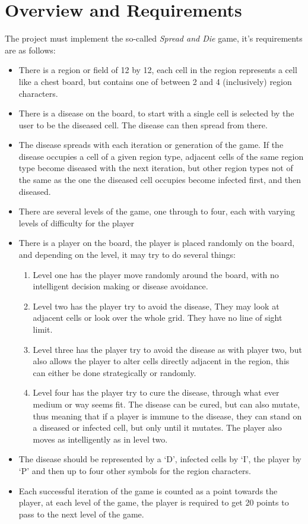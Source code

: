 \documentclass[pdftex,12pt,a4paper]{article}
\begin{document}
	\section{Overview and Requirements}
		The project must implement the so-called \emph{Spread and Die} game, it's requirements are as follows:
		\begin{itemize}
			\item There is a region or field of 12 by 12, each cell in the region represents a cell like a chest board, but contains one of between 2 and 4 (inclusively) region characters.
			\item There is a disease on the board, to start with a single cell is selected by the user to be the diseased cell. The disease can then spread from there.
			\item The disease spreads with each iteration or generation of the game. If the disease occupies a cell of a given region type, adjacent cells of the same region type become diseased with the next iteration, but other region types not of the same as the one the diseased cell occupies become infected first, and then diseased. 
			\item There are several levels of the game, one through to four, each with varying levels of difficulty for the player
			\item There is a player on the board, the player is placed randomly on the board, and depending on the level, it may try to do several things:
			\begin{enumerate}
				\item Level one has the player move randomly around the board, with no intelligent decision making or disease avoidance.
				\item Level two has the player try to avoid the disease, They may look at adjacent cells or look over the whole grid. They have no line of sight limit.
				\item Level three has the player try to avoid the disease as with player two, but also allows the player to alter cells directly adjacent in the region, this can either be done strategically or randomly.
				\item Level four has the player try to cure the disease, through what ever medium or way seems fit. The disease can be cured, but can also mutate, thus meaning that if a player is immune to the disease, they can stand on a diseased or infected cell, but only until it mutates. The player also moves as intelligently as in level two.
			\end{enumerate}
			\item The disease should be represented by a `D', infected cells by `I', the player by `P' and then up to four other symbols for the region characters.
			\item Each successful iteration of the game is counted as a point towards the player, at each level of the game, the player is required to get 20 points to pass to the next level of the game.
		\end{itemize}
\end{document}
